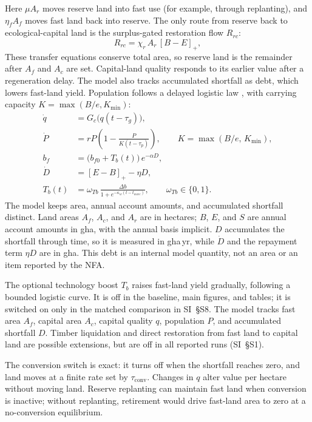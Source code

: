 \documentclass[preprint,12pt,authoryear]{elsarticle}
\newcommand{\pos}[1]{\left[#1\right]_+}
\newcommand{\tconv}{\tau_{\mathrm{conv}}}
\begin{document}
Here $\mu A_r$ moves reserve land into fast use (for example, through replanting), and $\eta_f A_f$ moves fast land back into reserve. The only route from reserve back to ecological-capital land is the surplus-gated restoration flow $R_{rc}$:
\begin{equation}\label{eq:Rrc}
R_{rc}=\chi_r\,A_r\,\pos{B-E},
\end{equation}
These transfer equations conserve total area, so reserve land is the remainder after $A_f$ and $A_c$ are set. Capital-land quality responds to its earlier value after a regeneration delay. The model also tracks accumulated shortfall as debt, which lowers fast-land yield. Population follows a delayed logistic law \citep{Pearl1925,Hutchinson1948}, with carrying capacity $K=\max(B/e,K_{\min})$:
\begin{align}
\dot q&=G_c\big(q(t-\tau_g)\big),\label{eq:q}\\
\dot P&=rP\left(1-\frac{P}{K(t-\tau_p)}\right),\qquad K=\max(B/e,\,K_{\min}),\label{eq:P}\\
b_f&=\big(b_{f0}+T_b(t)\big)\,e^{-\alpha D},\label{eq:bf}\\
\dot D&=\pos{E-B}-\eta D,\label{eq:D}\\
T_b(t)&=\omega_{Tb}\,\frac{\Delta b}{1+e^{-\kappa_w(t-t_{wave})}},\qquad \omega_{Tb}\in\{0,1\}.\label{eq:Tb}
\end{align}
The model keeps area, annual account amounts, and accumulated shortfall distinct. Land areas $A_f$, $A_c$, and $A_r$ are in hectares; $B$, $E$, and $S$ are annual account amounts in gha, with the annual basis implicit. $D$ accumulates the shortfall through time, so it is measured in gha\,yr, while $\dot D$ and the repayment term $\eta D$ are in gha. This debt is an internal model quantity, not an area or an item reported by the NFA.

The optional technology boost $T_b$ raises fast-land yield gradually, following a bounded logistic curve. It is off in the baseline, main figures, and tables; it is switched on only in the matched comparison in SI~\S S8. The model tracks fast area $A_f$, capital area $A_c$, capital quality $q$, population $P$, and accumulated shortfall $D$. Timber liquidation and direct restoration from fast land to capital land are possible extensions, but are off in all reported runs (SI~\S S1).

The conversion switch is exact: it turns off when the shortfall reaches zero, and land moves at a finite rate set by $\tconv$. Changes in $q$ alter value per hectare without moving land. Reserve replanting can maintain fast land when conversion is inactive; without replanting, retirement would drive fast-land area to zero at a no-conversion equilibrium.
\end{document}
